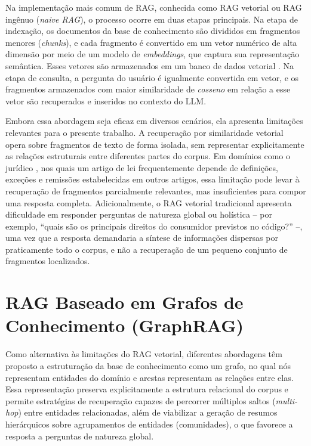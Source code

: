 Na implementação mais comum de RAG, conhecida como RAG vetorial ou RAG
ingênuo (\textit{naive RAG}), o processo ocorre em duas etapas principais. Na
etapa de indexação, os documentos da base de conhecimento são divididos em
fragmentos menores (\textit{chunks}), e cada fragmento é convertido em um
vetor numérico de alta dimensão por meio de um modelo de
\textit{embeddings}, que captura sua representação semântica. Esses vetores
são armazenados em um banco de dados vetorial \cite{johnson2019billion}. Na etapa de consulta, a
pergunta do usuário é igualmente convertida em vetor, e os fragmentos
armazenados com maior similaridade de \textit{cosseno} em relação a esse vetor
são recuperados e inseridos no contexto do LLM.

Embora essa abordagem seja eficaz em diversos cenários, ela apresenta
limitações relevantes para o presente trabalho. A recuperação por similaridade
vetorial opera sobre fragmentos de texto de forma isolada, sem representar
explicitamente as relações estruturais entre diferentes partes do corpus. Em
domínios como o jurídico \cite{cui2023chatlaw}, nos quais um artigo de lei frequentemente depende de
definições, exceções e remissões estabelecidas em outros artigos, essa
limitação pode levar à recuperação de fragmentos parcialmente relevantes, mas
insuficientes para compor uma resposta completa. Adicionalmente, o RAG
vetorial tradicional apresenta dificuldade em responder perguntas de natureza
global ou holística -- por exemplo, ``quais são os principais direitos do
consumidor previstos no código?'' --, uma vez que a resposta demandaria a
síntese de informações dispersas por praticamente todo o corpus, e não a
recuperação de um pequeno conjunto de fragmentos localizados.

\section{RAG Baseado em Grafos de Conhecimento (GraphRAG)}
\label{sec-fundteo-graphrag}

Como alternativa às limitações do RAG vetorial, diferentes abordagens têm
proposto a estruturação da base de conhecimento como um grafo, no qual nós
representam entidades do domínio e arestas representam as relações entre
elas. Essa representação preserva explicitamente a estrutura relacional do
corpus e permite estratégias de recuperação capazes de percorrer múltiplos
saltos (\textit{multi-hop}) entre entidades relacionadas, além de viabilizar a
geração de resumos hierárquicos sobre agrupamentos de entidades (comunidades),
o que favorece a resposta a perguntas de natureza global.

